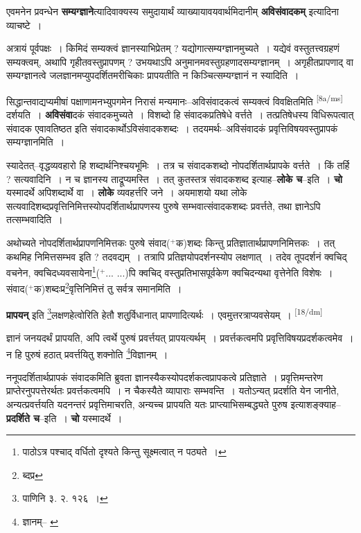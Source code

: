 \documentclass[article,12pt,a4paper]{memoir}
\newcommand{\add}[1]{($^{+}$#1)}
\begin{document}
	  \pstart एवमनेन प्रवन्धेन \textbf{सम्यग्ज्ञाने}त्यादिवाक्यस्य समुदायार्थं व्याख्यायावयवार्थमिदानीम् \textbf{अविसंवादकम्} इत्यादिना व्याचष्टे ।
	\pend
      

	  \pstart अत्रायं पूर्वपक्षः । किमिदं सम्यक्त्वं ज्ञानस्याभिप्रेतम् ? यद्योगात्सम्यग्ज्ञानमुच्यते । यद्येवं वस्तुतत्त्वग्रहणं सम्यक्त्वम्, अथापि गृहीतवस्तुप्रापणम् ? उभयथाऽपि अनुमानमवस्तुग्रहणादसम्यग्ज्ञानम् । अगृहीतप्रापणाद् वा सम्यग्ज्ञानत्वे जलज्ञानमप्युपदर्शितमरीचिकाः प्रापयतीति न किञ्चित्सम्यग्ज्ञानं न स्यादिति ।
	\pend
      

	  \pstart सिद्धान्तवाद्यप्यमीषां पक्षाणामनभ्युपगमेन निरासं मन्यमानः--अविसंवादकत्वं सम्यक्त्वं विवक्षितमिति \leavevmode\textsuperscript{\rmlatinfont\tiny [8a/ms]} दर्शयति । \textbf{अविसंवा}दकं संवादकमुच्यते । विशब्दो हि संवादकप्रतिषेधे वर्त्तते । तत्प्रतिषेधस्य विधिरूपत्वात् संवादक एवावतिष्ठत इति संवादकार्थोऽविसंवादकशब्दः । तदयमर्थः--अविसंवादकं प्रवृत्तिविषयवस्तुप्रापकं सम्यग्ज्ञानमिति ।
	\pend
      

	  \pstart स्यादेतत्--वृद्धव्यवहारो हि शब्दार्थनिश्चयभूमिः । तत्र च संवादकशब्दो नोपदर्शितार्थप्रापके वर्त्तते । किं तर्हि ? सत्यवादिनि । न च ज्ञानस्य ताद्रूप्यमस्ति । तत् कुतस्तत्र संवादकशब्द इत्याह--\textbf{लोके च}--इति । \textbf{चो} यस्मादर्थे अपिशब्दार्थे वा । \textbf{लोके} व्यवहर्त्तरि जने । अयमाशयो यथा लोके सत्यवादिशब्दप्रवृत्तिनिमित्तस्योपदर्शितार्थप्रापणस्य पुरुषे सम्भवात्संवादकशब्दः प्रवर्त्तते, तथा ज्ञानेऽपि तत्सम्भवादिति ।
	\pend
      

	  \pstart अथोच्यते नोपदर्शितार्थप्रापणनिमित्तकः पुरुषे संवाद\add{क}शब्दः किन्तु प्रतिज्ञातार्थप्रापणनिमित्तकः । तत् कथमिह निमित्तसम्भव इति ? तदवद्यम् । तत्रापि प्रतिज्ञयोपदर्शनस्योप लक्षणात् । तदेव तूपदर्शनं क्वचिद् वचनेन, क्वचिदध्यवसायेना\footnote{पाठोऽत्र पश्चाद् वर्धितो दृश्यते किन्तु सूक्ष्मत्वात् न पठ्यते ।}\add{... ...}पि क्वचिद् वस्तुप्रतिभासपूर्वकेण क्वचिदन्यथा वृत्तेनेति विशेषः । संवाद\add{क}शब्दःप्र\footnote{ब्दप्र}वृत्तिनिमित्तं तु सर्वत्र समानमिति ।
	\pend
      

	  \pstart \textbf{प्रापयन्} इति \footnote{पाणिनि ३. २. १२६ ।}लक्षणहेत्वोरिति हेतौ शतुर्विधानात् प्रापणादित्यर्थः । एवमुत्तरत्राप्यवसेयम् ।
	\pend
      \leavevmode\textsuperscript{\rmlatinfont\tiny [18/dm]}

	  \pstart ज्ञानं जनयदर्थं प्रापयति, अपि त्वर्थे पुरुषं प्रवर्त्तयत् प्रापयत्यर्थम् । प्रवर्त्तकत्वमपि प्रवृत्तिविषयप्रदर्शकत्वमेव । न हि पुरुषं हठात् प्रवर्त्तयितु शक्नोति \footnote{ज्ञानम्--\cite{dp-msB} \cite{dp-edN}}विज्ञानम् ।
	\pend
      

	  \pstart ननूपदर्शितार्थप्रापकं संवादकमिति ब्रुवता ज्ञानस्यैकस्योपदर्शकत्वप्रापकत्वे प्रतिज्ञाते । प्रवृत्तिमन्तरेण प्राप्तेरनुपपत्तेरर्थतः प्रवर्त्तकत्वमपि । न चैकस्यैते व्यापाराः सम्भवन्ति । यतोऽन्यत् प्रदर्शति येन जानीते, अन्यत्प्रवर्त्तयति यदनन्तरं प्रवृत्तिमाचरति, अन्यच्च प्रापयति यतः प्राप्त्याभिसम्बद्ध्यते पुरुष इत्याशङ्क्याह--\textbf{प्रदर्शिते च}--इति । \textbf{चो} यस्मादर्थे ।
	\pend
      
\end{document}

